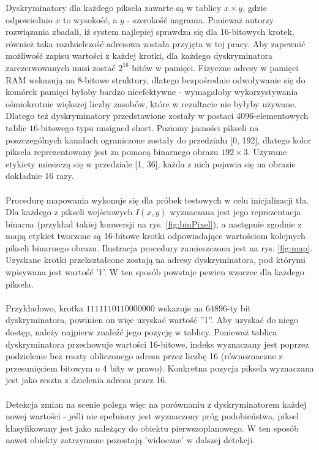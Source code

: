 Dyskryminatory dla każdego piksela zawarte są w tablicy $x\times y$, gdzie odpowiednio $x$ to wysokość, a $y$ - szerokość nagrania. Ponieważ autorzy rozwiązania zbadali, iż system najlepiej sprawdza się dla 16-bitowych krotek, również taka rozdzielczość adresowa została przyjęta w tej pracy. Aby zapewnić możliwość zapisu wartości z każdej krotki, dla każdego dyskryminatora zarezerwowanych musi zostać $2^{16}$ bitów w pamięci. Fizyczne adresy w pamięci RAM wskazują na 8-bitowe struktury, dlatego bezpośrednie odwoływanie się do komórek pamięci byłoby bardzo nieefektywne - wymagałoby wykorzystywania ośmiokrotnie większej liczby zasobów, które w rezultacie nie byłyby używane. Dlatego też dyskryminatory przedstawione zostały w postaci $4096$-elementowych tablic $16$-bitowego typu unsigned short. Poziomy jasności pikseli na poszczególnych kanałach ograniczone zostały do przedziału [0, 192], dlatego kolor piksela reprezentowany jest za pomocą binarnego obrazu $192 \times 3$. Używane etykiety mieszczą się w przedziale [1, 36], każda z nich pojawia się na obrazie dokładnie 16 razy. 
\paragraph{}
Procedurę mapowania wykonuje się dla próbek testowych w celu inicjalizacji tła. Dla każdego z pikseli wejściowych $I(x,y)$ wyznaczana jest jego reprezentacja binarna (przykład takiej konwersji na rys. \ref{fig:binPixel}), a następnie zgodnie z mapą etykiet tworzone są 16-bitowe krotki odpowiadające wartościom kolejnych pikseli binarnego obrazu. Ilustracja procedury zamieszczona jest na rys. \ref{fig:map}. Uzyskane krotki przekształcone zostają na adresy dyskryminatora, pod którymi wpisywana jest wartość '1'. W ten sposób powstaje pewien wzorzec dla każdego piksela.
\paragraph{}
Przykładowo, krotka $1111110110000000$ wskazuje na $64896$-ty bit dyskryminatora, powinien on więc uzyskać wartość ''1''. Aby uzyskać do niego dostęp, należy najpierw znaleźć jego pozycję w tablicy. Ponieważ tablica dyskryminatora przechowuje wartości 16-bitowe, indeks wyznaczany jest poprzez podzielenie bez reszty obliczonego adresu przez liczbę 16 (równoznaczne z przesunięciem bitowym o 4 bity w prawo). Konkretna pozycja piksela wyznaczana jest jako reszta z dzielenia adresu przez 16.   
\paragraph{}
Detekcja zmian na scenie polega więc na porównaniu z dyskryminatorem każdej nowej wartości - jeśli nie spełniony jest wyznaczony próg podobieństwa, piksel klasyfikowany jest jako należący do obiektu pierwszoplanowego. W ten sposób nawet obiekty zatrzymane pozostają 'widoczne' w dalszej detekcji.
